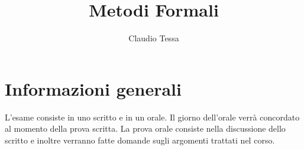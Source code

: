 \documentclass[12pt, a4paper]{article}
\title{Metodi Formali}
\author{Claudio Tessa}
\date{\the\year}
\begin{document}
\maketitle

\section*{Informazioni generali}
L'esame consiste in uno scritto e in un orale. Il giorno dell'orale verrà concordato al momento della prova scritta. La prova orale consiste nella discussione dello scritto e inoltre verranno fatte domande sugli argomenti trattati nel corso.

\tableofcontents
\newpage



\end{document}
